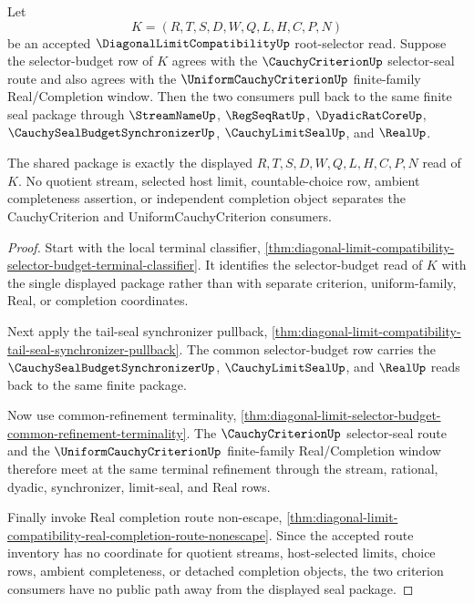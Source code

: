 \begin{theorem}
\label{thm:diagonal-limit-compatibility-criterion-uniform-seal-pullback}
Let
$$
K=(R,T,S,D,W,Q,L,H,C,P,N)
$$
be an accepted $\DiagonalLimitCompatibilityUp$ root-selector read. Suppose the selector-budget row of $K$ agrees with the $\CauchyCriterionUp$ selector-seal route and also agrees with the $\UniformCauchyCriterionUp$ finite-family Real/Completion window. Then the two consumers pull back to the same finite seal package through $\StreamNameUp$, $\RegSeqRatUp$, $\DyadicRatCoreUp$, $\CauchySealBudgetSynchronizerUp$, $\CauchyLimitSealUp$, and $\RealUp$.

The shared package is exactly the displayed $R,T,S,D,W,Q,L,H,C,P,N$ read of $K$. No quotient stream, selected host limit, countable-choice row, ambient completeness assertion, or independent completion object separates the CauchyCriterion and UniformCauchyCriterion consumers.
\end{theorem}
\begin{proof}
Start with the local terminal classifier, \autoref{thm:diagonal-limit-compatibility-selector-budget-terminal-classifier}. It identifies the selector-budget read of $K$ with the single displayed package rather than with separate criterion, uniform-family, Real, or completion coordinates.

Next apply the tail-seal synchronizer pullback, \autoref{thm:diagonal-limit-compatibility-tail-seal-synchronizer-pullback}. The common selector-budget row carries the $\CauchySealBudgetSynchronizerUp$, $\CauchyLimitSealUp$, and $\RealUp$ reads back to the same finite package.

Now use common-refinement terminality, \autoref{thm:diagonal-limit-selector-budget-common-refinement-terminality}. The $\CauchyCriterionUp$ selector-seal route and the $\UniformCauchyCriterionUp$ finite-family Real/Completion window therefore meet at the same terminal refinement through the stream, rational, dyadic, synchronizer, limit-seal, and Real rows.

Finally invoke Real completion route non-escape, \autoref{thm:diagonal-limit-compatibility-real-completion-route-nonescape}. Since the accepted route inventory has no coordinate for quotient streams, host-selected limits, choice rows, ambient completeness, or detached completion objects, the two criterion consumers have no public path away from the displayed seal package.
\end{proof}
